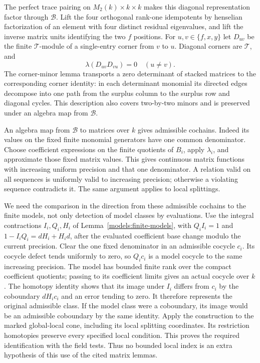 The perfect trace pairing on $M_2(k)\times k\times k$ makes
this diagonal representation factor through $\mathscr B$.
Lift the four orthogonal rank-one idempotents by henselian
factorization of an element with four distinct residual
eigenvalues, and lift the inverse matrix units identifying
the two $f$ positions.  For $u,v\in\{f,x,y\}$ let $D_{uv}$
be the finite $\mathscr T$-module of a single-entry corner
from $v$ to $u$.  Diagonal corners are $\mathscr T$, and
\begin{equation}
                 \lambda(D_{uv}D_{vu})=0\quad(u\ne v).
\label{extraction:cycles}
\end{equation}
The corner-minor lemma transports a zero determinant of
stacked matrices to the corresponding corner identity: in
each determinant monomial its directed edges decompose into
one path from the surplus column to the surplus row and
diagonal cycles.  This description also covers two-by-two
minors and is preserved under an algebra map from
$\mathscr B$.

An algebra map from $\mathscr B$ to matrices over $k$ gives
admissible cochains.  Indeed its values on the fixed finite
monomial generators have one common denominator.  Choose
coefficient expressions on the finite quotients of $B_i$,
apply $\lambda_i$, and approximate those fixed matrix values.
This gives continuous matrix functions with increasing uniform
precision and that one denominator.  A relation valid on
all sequences is uniformly valid to increasing precision;
otherwise a violating sequence contradicts it.  The same
argument applies to local splittings.

We need the comparison in the direction from these admissible
cochains to the finite models, not only detection of model
classes by evaluations.  Use the integral contractions
$I_i,Q_i,H_i$ of Lemma~\ref{models:finite-models}, with
$Q_iI_i=1$ and
$1-I_iQ_i=dH_i+H_id$, after the evaluated coefficient base
change modulo the current precision.  Clear the one fixed
denominator in an admissible cocycle $c_i$.  Its cocycle
defect tends uniformly to zero, so $Q_ic_i$ is a model
cocycle to the same increasing precision.  The model has
bounded finite rank over the compact coefficient quotients;
passing to its coefficient limits gives an actual cocycle
over $k$.  The homotopy identity shows that its image under
$I_i$ differs from $c_i$ by the coboundary $dH_ic_i$ and an
error tending to zero.  It therefore represents the original
admissible class.  If the model class were a coboundary, its
image would be an admissible coboundary by the same identity.
Apply the construction to the marked global-local cone,
including its local splitting coordinates.  Its restriction
homotopies preserve every specified local condition.  This
proves the required identification with the field tests.
Thus no bounded local index is an
extra hypothesis of this use of the cited matrix lemmas.

